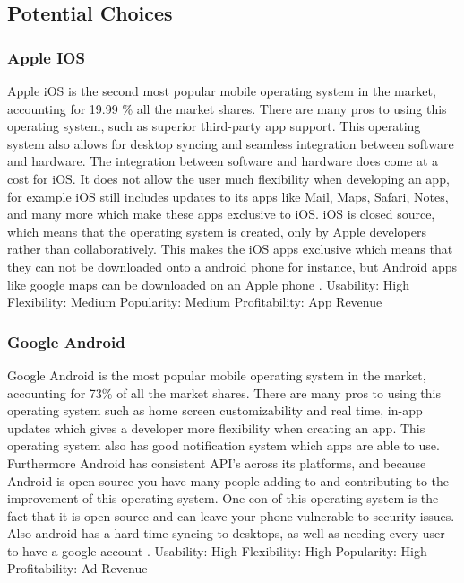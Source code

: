 \documentclass[compsoc, 10, draftclsnofoot, onecolumn]{IEEEtran}
\begin{document}
\subsection{Potential Choices}
\subsubsection{Apple IOS}
 Apple iOS is the second most popular mobile operating system in the market, accounting for 19.99 \% \cite{r1} all the market shares. There are many pros to using this operating system, such as superior third-party app support. This operating system also allows for desktop syncing and seamless integration between software and hardware. The integration between software and hardware does come at a cost for iOS. It does not allow the user much flexibility when developing an app, for example iOS still includes updates to its apps like Mail, Maps, Safari, Notes, and many more which make these apps exclusive to iOS. iOS is closed source, which means that the operating system is created, only by Apple developers rather than collaboratively. This makes the  iOS apps exclusive which means that they can not be downloaded onto a android phone for instance, but Android apps like google maps can be downloaded on an Apple phone \cite{r2}.
\newline
Usability: High
\newline
Flexibility: Medium
\newline
Popularity: Medium
\newline
Profitability: App Revenue
\newline
\newline
\subsubsection{Google Android}
\indent Google Android is the most popular mobile operating system in the market, accounting for 73\% \cite{r1} of all the market shares. There are many pros to using this operating system such as home screen customizability and real time, in-app updates which gives a developer more flexibility when creating an app. This operating system also has good notification system which apps are able to use. Furthermore Android has consistent API’s across its platforms, and because Android is open source you have many people adding to and contributing to the improvement of this operating system. One con of this operating system is the fact that it is open source and can leave your phone vulnerable to security issues. Also android has a hard time syncing to desktops, as well as needing every user to have a google account \cite{r2, r3}.
\newline
Usability: High
\newline
Flexibility: High
\newline
Popularity: High
\newline
Profitability: Ad Revenue
\newline
\newline
\end{document}
